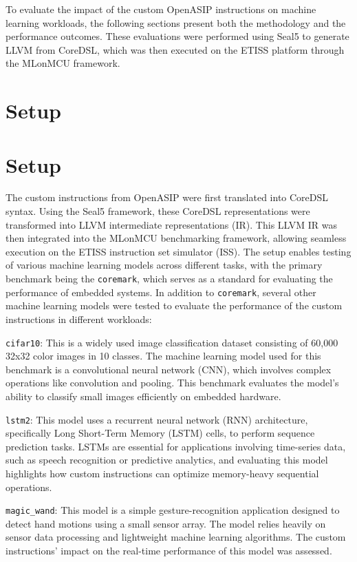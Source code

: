To evaluate the impact of the custom OpenASIP instructions on machine learning workloads, the following sections present both the methodology and the performance outcomes. These evaluations were performed using Seal5 to generate LLVM from CoreDSL, which was then executed on the ETISS platform through the MLonMCU framework.

\section{Setup}

\section{Setup}

The custom instructions from OpenASIP were first translated into CoreDSL syntax. Using the Seal5 framework, these CoreDSL representations were transformed into LLVM intermediate representations (IR). This LLVM IR was then integrated into the MLonMCU benchmarking framework, allowing seamless execution on the ETISS instruction set simulator (ISS). The setup enables testing of various machine learning models across different tasks, with the primary benchmark being the \texttt{coremark}, which serves as a standard for evaluating the performance of embedded systems. In addition to \texttt{coremark}, several other machine learning models were tested to evaluate the performance of the custom instructions in different workloads:

\texttt{cifar10}: This is a widely used image classification dataset consisting of 60,000 32x32 color images in 10 classes. The machine learning model used for this benchmark is a convolutional neural network (CNN), which involves complex operations like convolution and pooling. This benchmark evaluates the model's ability to classify small images efficiently on embedded hardware.

\texttt{lstm2}: This model uses a recurrent neural network (RNN) architecture, specifically Long Short-Term Memory (LSTM) cells, to perform sequence prediction tasks. LSTMs are essential for applications involving time-series data, such as speech recognition or predictive analytics, and evaluating this model highlights how custom instructions can optimize memory-heavy sequential operations.

\texttt{magic\_wand}: This model is a simple gesture-recognition application designed to detect hand motions using a small sensor array. The model relies heavily on sensor data processing and lightweight machine learning algorithms. The custom instructions' impact on the real-time performance of this model was assessed.

